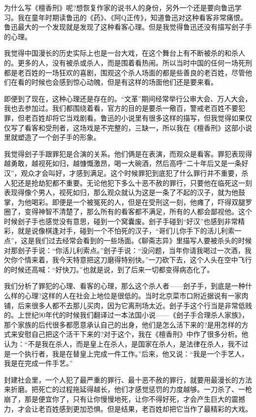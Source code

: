 \documentclass[12pt,a5paper]{ctexbook}
\begin{document}
为什么写《檀香刑》呢?想恢复作家的说书人的身份，另外一个还是要向鲁迅学习。我在童年时期读鲁迅的《药》、《阿Q正传》，知道鲁迅对这种看客非常痛恨。鲁迅最大的一个发现就是发现了这种看客心理。但是我觉得鲁迅还没有描写刽子手的心理。

我觉得中国漫长的历史实际上也是一台大戏，在这个舞台上有不断被杀的和杀人的。更多的人，没有被杀或杀人，而是围着看热闹。所以当时中国的任何一场死刑都是老百姓的一场狂欢的喜剧，围观这个杀人场面的都是些善良的老百姓，尽管他们在看的时候也会感到惊心动魄，但是有这样的场面他们还是要来看。

即便到了现在，这种心理还是存在的。“文革”期间经常举行公审大会、万人大会，我也去参加过。我们都围绕着看，官方的目的是要杀一儆百，警戒老百姓不要犯罪，但老百姓却将它当戏剧看。鲁迅的小说里有很多这样的描写，但我觉得如果仅仅写了看客和受刑者，这场戏是不完整的，三缺一，所以我在《檀香刑》这部小说里就塑造了一个刽子手的形象。

我觉得刽子手跟罪犯是合演的关系。他们俩是在表演，而观众是看客。罪犯表现得越勇敢，越视死如归，越慷慨激昂，喝一大碗酒，然后高呼“二十年后又是一条好汉”，观众才会叫好，才感到满足。这个时候罪犯到底犯了什么罪行并不重要，杀人犯还是抢劫犯都不重要。无论他犯下多么十恶不赦的罪行，只要他在临死这一刻表现得像个男人，视死如归，那么观众就认为这是一条了不起的汉子，就为他鼓掌，为他喝彩。即便是一个被冤死的人，但是在受刑这一刻，他瘫了，吓得双腿罗圈了，变得神智不清楚了，那么所有的看客都不满足，所有的人都会鄙视他。这个时候刽子手也感觉没有意思，碰到一个窝囊废。刽子手碰到“好汉”也感到非常精彩，就是说像棋逢对手，碰到一个不怕死的汉子，“哥们儿你手下的活儿利索一点”，这是我们过去经常会看到的一些场面。《聊斋志异》里描写人要被杀头的时候对那刽子手说：“你活儿利索点。”刽子手说：“没问题，当年你请我喝过一次酒，我欠你个情来着，我今天特意把这刀磨得特别快。”一刀砍下去，这个人头在空中飞行的时候还高喊：“好快刀。”也就是说，到了后来一切都变得病态化了。

我们分析了罪犯的心理、看客的心理，那么这个杀人者——刽子手，到底是一种什么样的心理?这样的人在社会上地位是很低的。当时北京菜市口附近据说有一家肉铺，后来很多人都不去那儿买肉，因为它离刑场太近。刽子手这个行当是非常低贱的。上世纪90年代的时候我们翻译过一本法国小说——《刽子手合理杀人家族》，那个家族的后代很多都愿意承认自己的出身，他们是怎么活下来的?是用怎样的方式来安慰自己把这个活干下来的?对于这个，我在《檀香刑》中作了很多分析。他认为：“不是我在杀人，而是皇上在杀人，是国家在杀人，是法律在杀人，我不过是一个执行者，我是在替皇上完成一件工作。”后来，他又说：“我是一个手艺人，我是在完成一件手艺。”

封建社会里，一个人犯了最严重的罪行、最十恶不赦的罪行，就要用最漫长的方法来折磨。把死亡的过程拖延得越长，他们才感觉惩罚的力度越够。一刀杀了、一枪崩了，那是便宜你了，只有让你慢慢地死，让你不得好死，才会产生巨大的震撼力，才会让老百姓感到更加恐惧。但是结果，老百姓却把它当作了最精彩的大戏。
\end{document}
